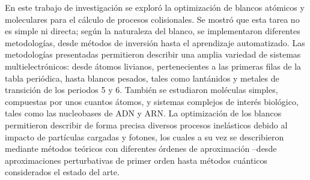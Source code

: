 En este trabajo de investigación se exploró la optimización de blancos
atómicos y moleculares para el cálculo de procesos colisionales. Se 
mostró que esta tarea no es simple ni directa; según la naturaleza del 
blanco, se implementaron diferentes metodologías, desde métodos de 
inversión hasta el aprendizaje automatizado. Las metodologías 
presentadas permitieron describir una amplia variedad de sistemas 
multielectrónicos: desde átomos livianos, 
pertenecientes a las primeras filas de la tabla periódica, hasta blancos 
pesados, tales como lantánidos y metales de transición de los 
periodos 5 y 6. También se estudiaron moléculas simples, compuestas por 
unos cuantos átomos, y sistemas complejos de interés biológico, tales 
como las nucleobases de ADN y ARN. La optimización de los blancos 
permitieron describir de forma precisa diversos procesos inelásticos 
debido al impacto de partículas cargadas y fotones, los cuales a su vez
se describieron mediante métodos teóricos con diferentes órdenes de 
aproximación --desde aproximaciones perturbativas de primer orden hasta 
métodos cuánticos considerados el estado del arte. 




